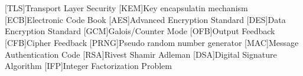 \cleardoublepage
\chapter*{\listofabbrevname}
{}

\begin{acronym}[mmmmmmm]
	[TLS]{Transport Layer Security}
	[KEM]{Key encapsulatin mechanism}
	[ECB]{Electronic Code Book}
	[AES]{Advanced Encryption Standard}
	[DES]{Data Encryption Standard}
	[GCM]{Galois/Counter Mode}
	[OFB]{Output Feedback}
	[CFB]{Cipher Feedback}
	[PRNG]{Pseudo random number generator}
	[MAC]{Message Authentication Code}
	[RSA]{Rivest Shamir Adleman}
	[DSA]{Digital Signature Algorithm}
	[IFP]{Integer Factorization Problem}
\end{acronym}
